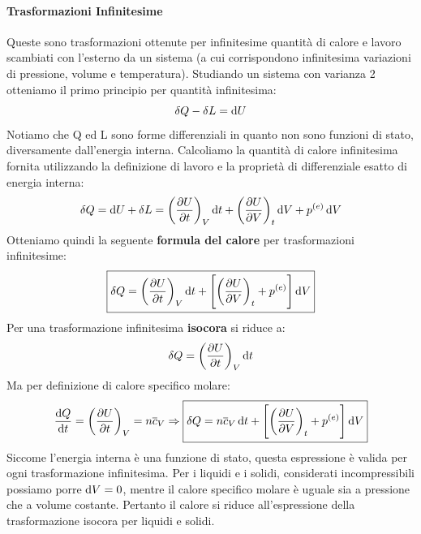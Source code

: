 \documentclass{article}
\newcommand{\then}{\ensuremath{\Rightarrow}}
\begin{document}
\paragraph{Trasformazioni Infinitesime}
Queste sono trasformazioni ottenute per infinitesime quantità di calore e lavoro scambiati con l'esterno da un sistema (a cui corrispondono infinitesima variazioni di pressione, volume e temperatura). Studiando un sistema con varianza 2 otteniamo il primo principio per quantità infinitesima:
\[\delta Q-\delta L=\dif U\]
Notiamo che Q ed L sono forme differenziali in quanto non sono funzioni di stato, diversamente dall'energia interna. Calcoliamo la quantità di calore infinitesima fornita utilizzando la definizione di lavoro e la proprietà di differenziale esatto di energia interna:
\[\delta Q=\dif U+\delta L=\left(\pdv{U}{t}\right)_V\dif t+\left(\pdv{U}{V}\right)_t\dif V+p^{(e)}\dif V\]
Otteniamo quindi la seguente \textbf{formula del calore} per trasformazioni infinitesime:
\begin{equation}
\boxed{\delta Q=\left(\pdv{U}{t}\right)_V\dif t+\left[\left(\pdv{U}{V}\right)_t+p^{(e)}\right]\dif V}
\end{equation}
Per una trasformazione infinitesima \textbf{isocora} si riduce a:
\[\delta Q=\left(\pdv{U}{t}\right)_V\dif t\]
Ma per definizione di calore specifico molare:
\[\dv{Q}{t}=\left(\pdv{U}{t}\right)_V=n\overline{c}_V\then \boxed{\delta Q=n\overline{c}_V\dif t+\left[\left(\pdv{U}{V}\right)_t+p^{(e)}\right]\dif V}\]
Siccome l'energia interna è una funzione di stato, questa espressione è valida per ogni trasformazione infinitesima.
Per i liquidi e i solidi, considerati incompressibili possiamo porre $\dif V=0$, mentre il calore specifico molare è uguale sia a pressione che a volume costante. Pertanto il calore si riduce all'espressione della trasformazione isocora per liquidi e solidi.
\end{document}

